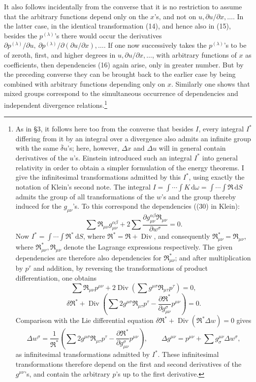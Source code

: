 \documentclass[11pt]{article}
\newcommand{\D}{\Delta}
\providecommand{\dd}{\mathrm d}
\providecommand{\Div}{\operatorname{Div}}
\providecommand{\bd}{\bar{\delta}}
\providecommand{\p}{\partial}
\providecommand{\p}{\partial}
\providecommand{\dd}{\mathrm d}
\begin{document}
It also follows incidentally from the converse that it is no restriction to assume that the arbitrary functions depend only on the \(x\)'s, and not on \(u,\p u/\p x,\ldots\). In the latter case, in the identical transformation (14), and hence also in (15), besides the \(p^{(\lambda)}\)'s there would occur the derivatives \(\p p^{(\lambda)}/\p u,\ \p p^{(\lambda)}/\p(\p u/\p x),\ldots\). If one now successively takes the \(p^{(\lambda)}\)'s to be of zeroth, first, and higher degrees in \(u,\p u/\p x,\ldots\), with arbitrary functions of \(x\) as coefficients, then dependencies (16) again arise, only in greater number. But by the preceding converse they can be brought back to the earlier case by being combined with arbitrary functions depending only on \(x\). Similarly one shows that mixed groups correspond to the simultaneous occurrence of dependencies and independent divergence relations.\footnote{As in \S{}3, it follows here too from the converse that besides \(I\), every integral \(I^*\) differing from it by an integral over a divergence also admits an infinite group with the same \(\bd u\)'s; here, however, \(\D x\) and \(\D u\) will in general contain derivatives of the \(u\)'s. Einstein introduced such an integral \(I^*\) into general relativity in order to obtain a simpler formulation of the energy theorems. I give the infinitesimal transformations admitted by this \(I^*\), using exactly the notation of Klein's second note. The integral \(I=\int\!\cdots\!\int K\,\dd\omega=\int\!\cdots\!\int \mathfrak{R}\,\dd S\) admits the group of all transformations of the \(w\)'s and the group thereby induced for the \(g_{\mu\nu}\)'s. To this correspond the dependencies ((30) in Klein):
\[
\sum \mathfrak{R}_{\mu\nu}g_{\mu\nu}^{\alpha\beta}
+2\sum\frac{\p g_{\mu\nu}^{\alpha\beta}\mathfrak{R}_{\mu\nu}}{\p w^\sigma}=0.
\]
Now \(I^*=\int\!\cdots\!\int \mathfrak{R}^*\,\dd S\), where \(\mathfrak{R}^*=\mathfrak{R}+\Div\), and consequently \(\mathfrak{R}_{\mu\nu}^*=\mathfrak{R}_{\mu\nu}\), where \(\mathfrak{R}_{\mu\nu}^*,\mathfrak{R}_{\mu\nu}\) denote the Lagrange expressions respectively. The given dependencies are therefore also dependencies for \(\mathfrak{R}_{\mu\nu}^*\); and after multiplication by \(p^\tau\) and addition, by reversing the transformations of product differentiation, one obtains
\[
\sum \mathfrak{R}_{\mu\nu}p^{\mu\nu}
+2\Div\!\left(\sum g^{\mu\sigma}\mathfrak{R}_{\mu\tau}p^\tau\right)=0,
\]
\[
\delta\mathfrak{R}^*+\Div\!\left(\sum 2g^{\mu\sigma}\mathfrak{R}_{\mu\tau}p^\tau
-\frac{\p\mathfrak{R}^*}{\p g_{\mu\nu}^{\sigma}}p^{\mu\nu}\right)=0.
\]
Comparison with the Lie differential equation
\(\delta\mathfrak{R}^*+\Div(\mathfrak{R}^*\D w)=0\) gives
\[
\D w^\sigma=\frac1{\mathfrak{R}^*}\left(\sum 2g^{\mu\sigma}\mathfrak{R}_{\mu\tau}p^\tau
-\frac{\p\mathfrak{R}^*}{\p g_{\mu\nu}^{\sigma}}p^{\mu\nu}\right),
\qquad
\D g^{\mu\nu}=p^{\mu\nu}+\sum g^{\mu\nu}_{\sigma}\D w^\sigma,
\]
as infinitesimal transformations admitted by \(I^*\). These infinitesimal transformations therefore depend on the first and second derivatives of the \(g^{\mu\nu}\)'s, and contain the arbitrary \(p\)'s up to the first derivative.}
\end{document}

